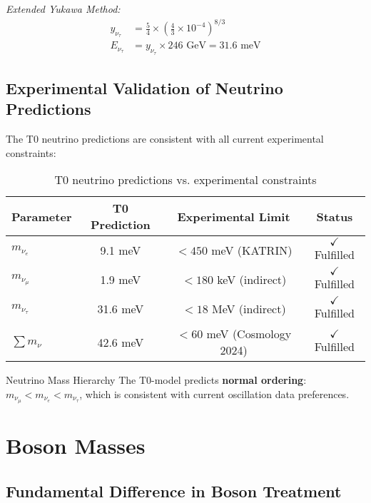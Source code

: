 \documentclass[12pt,a4paper]{article}
\begin{document}
	\textit{Extended Yukawa Method:}
	\begin{align}
		y_{\nu_\tau} &= \frac{5}{4} \times \left(\frac{4}{3} \times 10^{-4}\right)^{8/3} \\
		E_{\nu_\tau} &= y_{\nu_\tau} \times 246 \text{ GeV} = 31.6 \text{ meV}
	\end{align}
	
	\subsection{Experimental Validation of Neutrino Predictions}
	\label{subsec:neutrino_validation}
	
	The T0 neutrino predictions are consistent with all current experimental constraints:
	
	\begin{table}[H]
		\centering
		\begin{tabular}{lccc}
			\toprule
			\textbf{Parameter} & \textbf{T0 Prediction} & \textbf{Experimental Limit} & \textbf{Status} \\
			\midrule
			$m_{\nu_e}$ & 9.1 meV & $< 450$ meV (KATRIN) & $\checkmark$ Fulfilled \\
			$m_{\nu_\mu}$ & 1.9 meV & $< 180$ keV (indirect) & $\checkmark$ Fulfilled \\
			$m_{\nu_\tau}$ & 31.6 meV & $< 18$ MeV (indirect) & $\checkmark$ Fulfilled \\
			$\sum m_\nu$ & 42.6 meV & $< 60$ meV (Cosmology 2024) & $\checkmark$ Fulfilled \\
			\bottomrule
		\end{tabular}
		\caption{T0 neutrino predictions vs. experimental constraints}
		\label{tab:neutrino_validation}
	\end{table}
	
	\begin{important}{Neutrino Mass Hierarchy}{}
		The T0-model predicts \textbf{normal ordering}: $m_{\nu_\mu} < m_{\nu_e} < m_{\nu_\tau}$, which is consistent with current oscillation data preferences.
	\end{important}
	
	\section{Boson Masses}
	\label{sec:boson_masses}
	
	\subsection{Fundamental Difference in Boson Treatment}
	\label{subsec:boson_difference}
	
\end{document}
